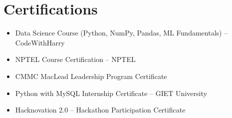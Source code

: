 \documentclass[a4paper,10pt]{article}
\begin{document}
\section{Certifications}
\begin{itemize}[leftmargin=12pt, nosep]
    \item Data Science Course (Python, NumPy, Pandas, ML Fundamentals) -- CodeWithHarry
    \item NPTEL Course Certification -- NPTEL
    \item CMMC MacLead Leadership Program Certificate
    \item Python with MySQL Internship Certificate -- GIET University
    \item Hacknovation 2.0 -- Hackathon Participation Certificate
\end{itemize}

\vfill
\end{document}
